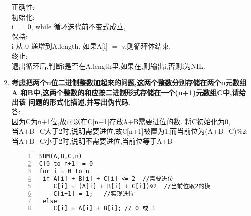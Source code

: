 \begin{enumerate}
正确性:\\
\hspace*{2 em}初始化:\\
\hspace*{4 em} i $=$ 0, while 循环迭代前不变式成立,\\      
\hspace*{2 em}保持:\\
\hspace*{4 em} i 从 0 递增到A.length. 如果A[i] $=$ v,则循环体结束.\\
\hspace*{2 em}终止:\\
\hspace*{4 em} 退出循环后,判断i是否在A.length里,如果在,则输出i,否则i为NIL.

\item
\textbf{考虑把两个n位二进制整数加起来的问题,这两个整数分别存储在两个n元数组A
      和B中,这两个整数的和应按二进制形式存储在一个(n+1)元数组C中,请给出该
      问题的形式化描述,并写出伪代码.}\\
答:\\
\hspace*{2 em} 因为C为n+1位,故可以在C[n+1]存放A+B需要进位的数. 将C初始化为0,\\
\hspace*{2 em} 当A+B+C大于2时,说明需要进位,故C[n+1]被置为1,而当前位为(A+B+C)\%2;\\
\hspace*{2 em} 当A+B+C小于2时,说明不需要进位,当前位等于A+B
\begin{lstlisting}[numbers=left]
SUM(A,B,C,n)
C[0 to n+1] = 0
for i = 0 to n
 if A[i] + B[i] + C[i] <= 2  //需要进位
    C[i] = (A[i] + B[i] + C[i])%2  //当前位取2的模
    C[i+1] = 1;   //实现进位 
 else
    C[i] = A[i] + B[i]; // 0 或 1       
\end{lstlisting}     
\end{enumerate}

